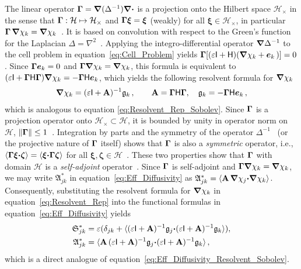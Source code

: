 \documentclass[english,12pt,jmp,graphicx]{revtex4-1}
\newcommand{\vecxi}{\boldsymbol{\xi}}
\newcommand{\veczeta}{\boldsymbol{\zeta}}
\newcommand{\vecg}{\mathfrak{g}}
\newcommand{\vece}{\boldsymbol{e}}
\newcommand{\bnabla}{\mbox{\boldmath${\nabla}$}}
\newcommand{\bGamma}{\mbox{\boldmath${\Gamma}$}}
\newcommand{\bcdot}{\mbox{\boldmath${\cdot}$}}
\newcommand{\Sg}{\mathfrak{S}}
\newcommand{\Ag}{\mathfrak{A}}
\newcommand{\Hc}{\mathcal{H}}
\newcommand{\Hm}{\mathsf{H}}
\newcommand{\Mm}{\mathsf{M}}
\newcommand{\Am}{\mathsf{A}}
\newcommand{\Ib}{\mathsf{I}}
\newcommand{\Ab}{\mathbf{A}}
\begin{document}
The linear operator $\bGamma=\bnabla(\Delta^{-1})\bnabla\bcdot$ is a
projection onto the Hilbert space $\Hc_\times$ in the sense that
$\bGamma:\Hc\mapsto\Hc_\times$ 
and $\bGamma\vecxi=\vecxi$ (weakly) for all $\vecxi\in\Hc_\times$,
in particular $\bGamma\,\bnabla\chi_k=\bnabla\chi_k$~\cite{Fannjiang:1994:SIAM_JAM:333,Murphy:ADSTPF-2017}. It is  based on
convolution with respect to the Green's function for the Laplacian
$\Delta=\nabla^2$~\cite{Stakgold:BVP:2000,Melnikov:2012:Green}. Applying the
integro-differential operator $\bnabla\Delta^{-1}$ to the 
cell problem in equation~\eqref{eq:Cell_Problem} yields
$\bGamma[(\varepsilon\Ib+\Hm)(\bnabla\chi_k+\vece_k\,)]=0$. Since
$\bGamma\vece_k=0$ and $\bGamma\bnabla\chi_k=\bnabla\chi_k$, this formula is
equivalent to
$(\varepsilon\Ib+\bGamma\Hm\bGamma)\bnabla\chi_k=-\bGamma\Hm\vece_k$,
which yields the following resolvent formula for $\bnabla\chi_k$   
% 
\begin{align}\label{eq:Resolvent_Rep}
  \bnabla\chi_k=(\varepsilon\Ib+\Ab)^{-1}\vecg_k\,,
           \qquad
  \Ab=\bGamma\Hm\bGamma, \quad
  \vecg_k=-\bGamma\Hm\vece_k\,,
\end{align}
%
which is analogous to equation \eqref{eq:Resolvent_Rep_Sobolev}.
Since $\bGamma$ is a projection operator onto $\Hc_\times\subset\Hc$, it is
bounded by unity in operator norm on $\Hc$,
$\|\bGamma\|\leq1$~\cite{PapaRudin:87,Folland:99:RealAnalysis}. Integration by
parts and the symmetry of the operator
$\Delta^{-1}$~\cite{Stakgold:BVP:2000} (or the projective nature of
$\bGamma$ itself) shows that $\bGamma$ is also a
\emph{symmetric} operator, i.e.,
$\langle\bGamma\vecxi\bcdot\veczeta\rangle=\langle\vecxi\bcdot\bGamma\veczeta\rangle$ for all
$\vecxi,\veczeta\in\Hc$~\cite{Murphy:ADSTPF-2017}. These
two properties show that $\bGamma$ with domain $\Hc$ is a \emph{self-adjoint}
operator~\cite{Reed-1980}. Since $\bGamma$ is self-adjoint
and $\bGamma\bnabla\chi_k=\bnabla\chi_k$, we may write $\Ag^*_{jk}$ in
equation~\eqref{eq:Eff_Diffusivity} as
$\Ag^*_{jk}=\langle\Ab\,\bnabla\chi_j\bcdot\bnabla \chi_k\rangle$. Consequently,
substituting the resolvent formula for $\bnabla\chi_k$
in equation~\eqref{eq:Resolvent_Rep} into the functional formulas
in equation~\eqref{eq:Eff_Diffusivity} yields  
%
\begin{align}\label{eq:Eff_Diffusivity_Resolvent}
 \Sg^*_{jk}&=\varepsilon(\delta_{jk}+\langle(\varepsilon\Ib+\Ab)^{-1}\vecg_j\bcdot(\varepsilon\Ib+\Ab)^{-1}\vecg_k\rangle), 
 \\
 \Ag^*_{jk}&=\langle\Ab\,(\varepsilon\Ib+\Ab)^{-1}\vecg_j\bcdot(\varepsilon\Ib+\Ab)^{-1}\vecg_k\rangle\,,
 \notag
\end{align}
%
which is a direct analogue of
equation~\eqref{eq:Eff_Diffusivity_Resolvent_Sobolev}. 
\end{document}
